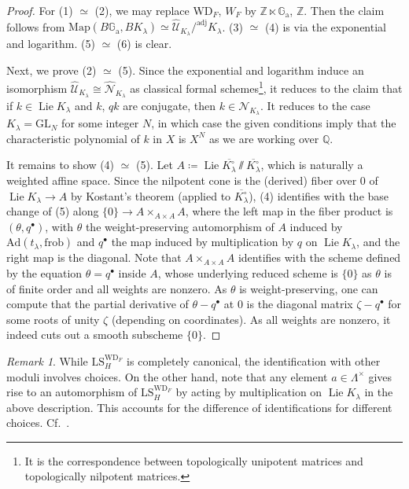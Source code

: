 \documentclass{amsart}
\theoremstyle{definition}
\theoremstyle{remark}
\newtheorem{remark}[theorem]{Remark}
\numberwithin{equation}{section}
\DeclareMathOperator{\Lie}{Lie}
\newcommand{\mc}{\mathcal}
\newcommand{\Q}{\mathbb{Q}}
\newcommand{\Z}{\mathbb{Z}}
\newcommand{\GL}{\mathrm{GL}}
\newcommand{\wh}{\widehat}
\newcommand{\frob}{\mathrm{frob}}
\newcommand{\Ad}{\mathrm{Ad}}
\newcommand{\WD}{\mathrm{WD}}
\newcommand{\Ga}{\mathbb{G}_{\mathrm{a}}}
\newcommand{\Map}{\mathrm{Map}}
\newcommand{\LS}{\mathrm{LS}}
\newcommand{\adj}{\mathrm{adj}}
\begin{document}
\begin{proof}
For (1) $\simeq$ (2), we may replace $\WD_F$, $W_F$ by $\Z\ltimes \Ga$, $\Z$. Then the claim follows from $\Map(B\Ga, BK_{\lambda})\simeq \wh{\mc U}_{K_{\lambda}}/^\adj K_\lambda$. (3) $\simeq$ (4) is via the exponential and logarithm. (5) $\simeq$ (6) is clear. 

Next, we prove (2) $\simeq$ (5). Since the exponential and logarithm induce an isomorphism $\wh{\mc U}_{K_{\lambda}}\cong \wh{\mc N}_{K_{\lambda}}$ as classical formal schemes\footnote{It is the correspondence between topologically unipotent matrices and topologically nilpotent matrices.}, it reduces to the claim that if $k\in \Lie K_{\lambda}$ and $k$, $qk$ are conjugate, then $k\in \mc N_{K_{\lambda}}$. It reduces to the case $K_{\lambda}=\GL_N$ for some integer $N$, in which case the given conditions imply that the characteristic polynomial of $k$ in $X$ is $X^N$ as we are working over $\Q$. 

It remains to show (4) $\simeq$ (5). Let $A\coloneq \Lie \overline{K_\lambda^\circ} \sslash \overline{K_\lambda^\circ}$, which is naturally a weighted affine space. Since the nilpotent cone is the (derived) fiber over $0$ of $\Lie K_\lambda \to A$ by Kostant's theorem (applied to $\overline{K_\lambda^\circ}$), (4) identifies with the base change of (5) along $\{0\}\to A \times_{A\times A}A$, where the left map in the fiber product is $(\theta, q^\bullet)$, with $\theta$ the weight-preserving automorphism of $A$ induced by $\Ad(t_\lambda, \frob)$ and $q^\bullet$ the map induced by multiplication by $q$ on $\Lie K_\lambda$, and the right map is the diagonal. Note that $A \times_{A\times A}A$ identifies with the scheme defined by the equation $\theta=q^\bullet$ inside $A$, whose underlying reduced scheme is $\{0\}$ as $\theta$ is of finite order and all weights are nonzero. As $\theta$ is weight-preserving, one can compute that the partial derivative of $\theta-q^{\bullet}$ at $0$ is the diagonal matrix $\zeta -q^\bullet$ for some roots of unity $\zeta$ (depending on coordinates). As all weights are nonzero, it indeed cuts out a smooth subscheme $\{0\}$. 
\end{proof}

\begin{remark}
While $\LS_{H}^{\WD_F}$ is completely canonical, the identification with other moduli involves choices. On the other hand, note that any element $a\in \Lambda^\times$ gives rise to an automorphism of $\LS_H^{\WD_F}$ by acting by multiplication on $\Lie K_\lambda$ in the above description. This accounts for the difference of identifications for different choices. Cf.~\cite[Proposition 3.12]{Zhu}. 
\end{remark}
\end{document}

